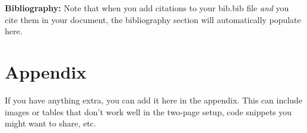 \documentclass{article}\usepackage[]{graphicx}\usepackage[]{xcolor}
\begin{document}
\begin{multicols}{2}
\vspace{2em}

\noindent\textbf{Bibliography:} Note that when you add citations to your bib.bib file \emph{and}
you cite them in your document, the bibliography section will automatically populate here.


\begin{tiny}

\end{tiny}
\end{multicols}

\newpage
\onecolumn
\section{Appendix}

If you have anything extra, you can add it here in the appendix. This can include images or tables that don't work well in the two-page setup, code snippets you might want to share, etc.
\end{document}
